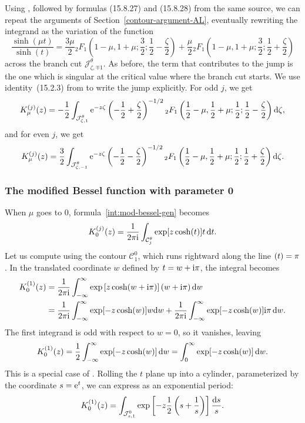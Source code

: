 \documentclass[10pt,a4paper]{amsart}
\let\Im\relax
\DeclareMathOperator{\Im}{Im}
\numberwithin{equation}{section}
\begin{document}
Using \cite[formula~(15.8.4)]{dlmf}, followed by formulas (15.8.27) and (15.8.28) from the same source, we can repeat the arguments of Section~\ref{contour-argument-AL}, eventually rewriting the integrand as the variation of the function
\[ \frac{\sinh(\mu t)}{\sinh(t)} = \frac{3\mu}{2} {}_2F_1\left(1 - \mu, 1 + \mu; \frac{3}{2};\frac{1}{2} - \frac{\zeta}{2}\right) + \frac{\mu}{2} {}_2F_1\left(1 - \mu, 1 + \mu; \frac{3}{2}; \frac{1}{2} + \frac{\zeta}{2}\right) \]
across the branch cut $\mathcal{J}^\theta_{\zeta, \mp 1}$. As before, the term that contributes to the jump is the one which is singular at the critical value where the branch cut starts. We use identity~(15.2.3) from \cite{dlmf} to write the jump explicitly. For odd $j$, we get
\begin{equation}\label{eq: K_j_mu at 1}
 K^{(j)}_\mu(z) = -\frac{1}{2} \int_{\mathcal{J}^\theta_{\zeta, 1}} {\rm e}^{-z\zeta} \left(-\frac{1}{2}+\frac{\zeta}{2}\right)^{-1/2} {}_2F_1\left(\frac{1}{2} - \mu, \frac{1}{2} + \mu; \frac{1}{2}; \frac{1}{2} - \frac{\zeta}{2}\right) {\rm d}\zeta,
\end{equation}
and for even $j$, we get
\[%
 K^{(j)}_\mu(z) = \frac{3}{2} \int_{\mathcal{J}^\theta_{\zeta, -1}} {\rm e}^{-z\zeta} \left(-\frac{1}{2}-\frac{\zeta}{2}\right)^{-1/2} {}_2F_1\left(\frac{1}{2} - \mu, \frac{1}{2} + \mu; \frac{1}{2}; \frac{1}{2} + \frac{\zeta}{2}\right) {\rm d}\zeta.
\]
%
\subsubsection[The modified Bessel function with parameter 0]{The modified Bessel function with parameter 0} \label{sec:bessel-0}

When $\mu$ goes to $0$, formula~\eqref{int:mod-bessel-gen} becomes
\[ K_0^{(j)}(z) = \frac{1}{2 \pi {\rm i}} \int_{\mathcal{C}_j^\theta} \exp[z \cosh(t)] t \,{\rm d}t. \]
Let us compute  using the contour $\mathcal{C}_1^0$, which runs rightward along the line $\Im(t) = \pi$. In the translated coordinate $w$ defined by $t = w + {\rm i}\pi$, the integral becomes
\begin{align*}
K_0^{(1)}(z) & = \frac{1}{2 \pi {\rm i}} \int_{-\infty}^\infty \exp\left[z \cosh(w + {\rm i}\pi)\right] (w + {\rm i}\pi)\,{\rm d}w \\
& = \frac{1}{2 \pi {\rm i}} \int_{-\infty}^\infty \exp[-z \cosh(w)] w {\rm d}w + \frac{1}{2 \pi {\rm i}} \int_{-\infty}^\infty \exp[-z \cosh(w)] {\rm i}\pi\, {\rm d}w.
\end{align*}
The first integrand is odd with respect to $w = 0$, so it vanishes, leaving
\begin{align}
K_0^{(1)}(z) = \frac{1}{2} \int_{-\infty}^\infty \exp [-z \cosh(w) ] \,{\rm d}w = \int_0^\infty \exp[-z \cosh(w)] \,{\rm d}w. \label{int:k0_cosh}
\end{align}
This is a special case of \cite[formula~(10.32.9)]{dlmf}. Rolling the $t$ plane up into a cylinder, parameterized by the coordinate $s = {\rm e}^t$, we can express  as an exponential period:
\[ K_0^{(1)}(z) = \int_{\mathcal{J}^0_{s, 1}} \exp\left[-z \frac{1}{2}\left(s + \frac{1}{s}\right)\right] \frac{{\rm d}s}{s}. \]
\end{document}

